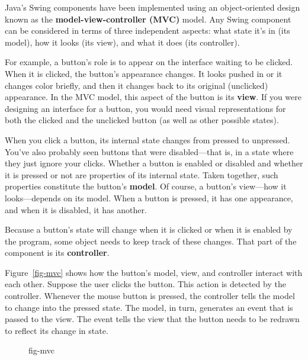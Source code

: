 \noindent Java's Swing components have been implemented using an
object-oriented design known as the {\bf model-view-controller (MVC)}
model.  Any Swing component can be considered in terms of three
independent aspects: what state it's in (its model), how it looks (its
view), and what it does (its controller).

For example, a button's role is to appear on the interface waiting to
be clicked.   When it is clicked, the button's appearance changes.  It
looks pushed in or it changes color briefly, and then it changes back
to its original (unclicked) appearance.   In the MVC model, this aspect
of the button is its {\bf view}. If you were designing an interface
for a button, you would need visual representations for both the
clicked and the unclicked button (as well as other possible states).

When you click a button, its internal state changes from pressed to
unpressed.  You've also probably seen buttons that were
disabled---that is, in a state where they just ignore your clicks.
Whether a button is enabled or disabled and whether it is pressed or
not are properties of its internal state.  Taken together, such properties
constitute the button's {\bf model}.  Of
course, a button's view---how it looks---depends on its model.  When a
button is pressed, it has one appearance, and when it is disabled, it
has another.

Because a button's state will change when it is clicked or when it is
enabled by the program, some object needs to keep track of these
changes.  That part of the component is its {\bf
controller}.  

Figure~\ref{fig-mvc} shows how the button's model, view, and
controller interact with each other.  Suppose the user clicks the
button.  This action is detected by the controller.  Whenever the mouse
button is pressed, the controller tells the model to change into the
pressed state.  The model, in turn, generates an event that is passed
to the view.  The event tells the view that the button needs to be
redrawn to reflect its change in state.

\begin{figure}[t]
{fig-mvc}

\end{figure}

